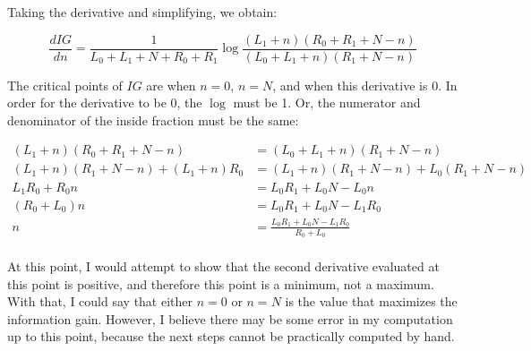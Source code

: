 \documentclass[fleqn]{homework}
\begin{document}
\begin{problem}{4}
    Taking the derivative and simplifying, we obtain:

    \begin{equation*}
      \frac{dIG}{dn} = \frac{1}{L_0+L_1+N+R_0+R_1} \log \frac{(L_1+n)(R_0+R_1+N-n)}{(L_0+L_1+n)(R_1+N-n)}
    \end{equation*}

    The critical points of $IG$ are when $n=0$, $n=N$, and when this derivative
    is 0.  In order for the derivative to be $0$, the $\log$ must be 1.  Or, the
    numerator and denominator of the inside fraction must be the same:

    \begin{align*}
      (L_1+n)(R_0+R_1+N-n) &= (L_0+L_1+n)(R_1+N-n) \\
      (L_1+n)(R_1+N-n) + (L_1+n)R_0 &= (L_1+n)(R_1+N-n) + L_0(R_1+N-n) \\
      L_1 R_0 + R_0 n &= L_0 R_1 + L_0 N - L_0 n \\
      (R_0 + L_0) n &= L_0 R_1 + L_0 N - L_1 R_0 \\
      n &= \frac{L_0 R_1 + L_0 N - L_1 R_0}{R_0 + L_0} \\
    \end{align*}

    At this point, I would attempt to show that the second derivative evaluated
    at this point is positive, and therefore this point is a minimum, not a
    maximum.  With that, I could say that either $n=0$ or $n=N$ is the value
    that maximizes the information gain.  However, I believe there may be some
    error in my computation up to this point, because the next steps cannot be
    practically computed by hand.
  \end{problem}
\end{document}
